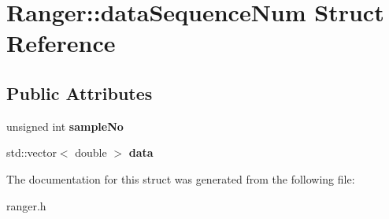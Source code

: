 \hypertarget{structRanger_1_1dataSequenceNum}{}\section{Ranger\+:\+:data\+Sequence\+Num Struct Reference}
\label{structRanger_1_1dataSequenceNum}
\subsection*{Public Attributes}
\begin{DoxyCompactItemize}
\item 
unsigned int {\bfseries sample\+No}\hypertarget{structRanger_1_1dataSequenceNum_a445b538f2723e28ecd491e7134aebf2a}{}\label{structRanger_1_1dataSequenceNum_a445b538f2723e28ecd491e7134aebf2a}

\item 
std\+::vector$<$ double $>$ {\bfseries data}\hypertarget{structRanger_1_1dataSequenceNum_ae830d296270962774b3958c2ab3e7e4d}{}\label{structRanger_1_1dataSequenceNum_ae830d296270962774b3958c2ab3e7e4d}

\end{DoxyCompactItemize}


The documentation for this struct was generated from the following file\+:\begin{DoxyCompactItemize}
\item 
ranger.\+h\end{DoxyCompactItemize}
